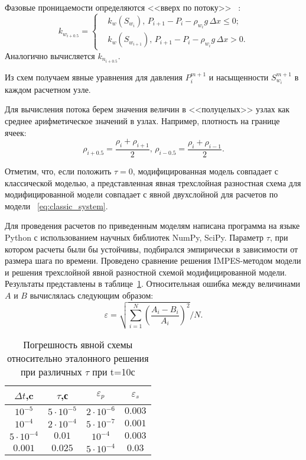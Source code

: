 Фазовые проницаемости определяются <<вверх по потоку>> ~\cite{Kanevskaya}:
\begin{equation}
k_{w_{i+0.5}} =
 \begin{cases}
  &k_w(S_{w_i}),\, P_{i+1}-P_i-\rho_{w_i}g\,\Delta x \le 0;
  \\
  &k_w(S_{w_{i+1}}),\, P_{i+1}-P_i-\rho_{w_i}g\,\Delta x > 0.
 \end{cases}
\end{equation}
Аналогично вычисляется $k_{n_{i+0.5}}$.

Из схем получаем явные уравнения для давления $P_i^{m+1}$ и насыщенности $S_{w_i}^{m+1}$
в каждом расчетном узле. 

Для вычисления потока берем значения величин в <<полуцелых>> узлах как среднее арифметическое
значений в узлах. Например, плотность на границе ячеек:
\begin{equation}
\rho_{i+0.5}=\dfrac{\rho_i+\rho_{i+1}}{2},\, \rho_{i-0.5}=\dfrac{\rho_i+\rho_{i-1}}{2}.
\end{equation}

Отметим, что, если положить $\tau=0$, модифицированная модель совпадает с классической моделью,
а представленная явная трехслойная разностная схема для модифицированной модели совпадает с явной двухслойной
для расчетов по модели ~\eqref{eq:classic_system}.

Для проведения расчетов по приведенным моделям написана программа на языке Python с использованием научных библиотек NumPy, SciPy.
Параметр $\tau$, при котором расчеты были бы устойчивы, подбирался эмпирически в зависимости от размера шага по времени.
Проведено сравнение решения IMPES-методом модели и решения трехслойной явной разностной схемой
модифицированной модели.
Результаты представлены в таблице~\ref{tabular:results}.
Относительная ошибка между величинами $A$ и $B$ вычислялась следующим образом: 
\begin{equation}
 \varepsilon=\sqrt{\sum\limits_{i=1}^N\left({\frac{A_i-B_i}{A_i}}\right)^2} / N.
\end{equation}
\begin{table}[h!]
\caption{Погрешность явной схемы относительно эталонного решения при различных $\tau$ при t=10с}
\label{tabular:results}
\begin{center}
\begin{tabular}{|c|c|c|c|}
\hline
$\Delta t$,c & $\tau$,с & $\varepsilon_p$ & $\varepsilon_s$  \\
\hline
$ 10^{-5}$ & $5 \cdot 10^{-5}$ & $ 2 \cdot 10^{-6}$ & $ 0.003 $ \\
\hline
$ 10^{-4}$ & $2 \cdot 10^{-4}$ & $ 5 \cdot 10^{-7}$ & $ 0.001 $ \\
\hline
$5 \cdot 10^{-4}$ & $0.01$ & $ 10^{-4}$ & $ 0.003 $ \\
\hline
$0.001$ & $0.025$ & $ 5 \cdot 10^{-4}$ & $ 0.03 $ \\
\hline
\end{tabular}
\end{center}
\end{table}

